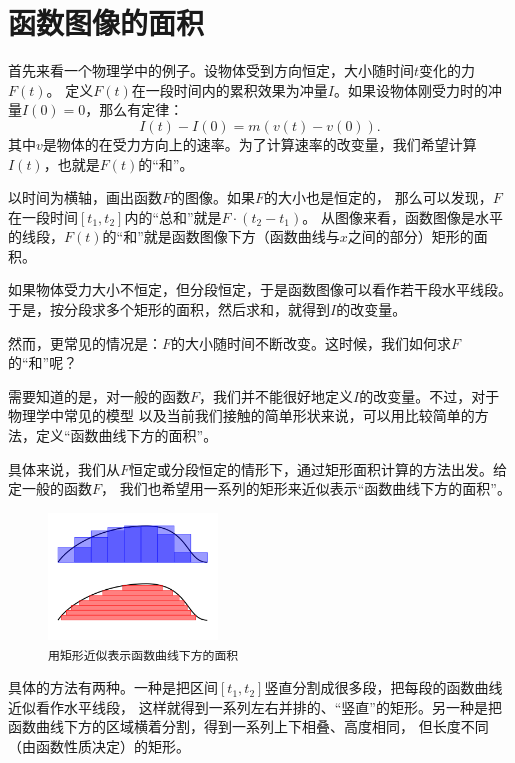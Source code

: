 \documentclass[12pt,UTF8]{ctexbook}
\begin{document}
\section{函数图像的面积}

首先来看一个物理学中的例子。设物体受到方向恒定，大小随时间$t$变化的力$F(t)$。
定义$F(t)$在一段时间内的累积效果为冲量$I$。如果设物体刚受力时的冲量$I(0) = 0$，那么有定律：
$$ I(t) - I(0) = m(v(t) - v(0)).$$
其中$v$是物体的在受力方向上的速率。为了计算速率的改变量，我们希望计算$I(t)$，也就是$F(t)$的“和”。

以时间为横轴，画出函数$F$的图像。如果$F$的大小也是恒定的，
那么可以发现，$F$在一段时间$[t_1, t_2]$内的“总和”就是$F \cdot (t_2 - t_1)$。
从图像来看，函数图像是水平的线段，$F(t)$的“和”就是函数图像下方（函数曲线与$x$之间的部分）矩形的面积。

如果物体受力大小不恒定，但分段恒定，于是函数图像可以看作若干段水平线段。
于是，按分段求多个矩形的面积，然后求和，就得到$I$的改变量。

然而，更常见的情况是：$F$的大小随时间不断改变。这时候，我们如何求$F$的“和”呢？

需要知道的是，对一般的函数$F$，我们并不能很好地定义$I$的改变量。不过，对于物理学中常见的模型
以及当前我们接触的简单形状来说，可以用比较简单的方法，定义“函数曲线下方的面积”。

具体来说，我们从$F$恒定或分段恒定的情形下，通过矩形面积计算的方法出发。给定一般的函数$F$，
我们也希望用一系列的矩形来近似表示“函数曲线下方的面积”。

\begin{figure}[h] %
    \vspace{4pt}
    \centering
    \includegraphics[width=0.4\textwidth]{积分定义5.png}
    \caption*{\texttt{用矩形近似表示函数曲线下方的面积}}
\end{figure}

具体的方法有两种。一种是把区间$[t_1, t_2]$竖直分割成很多段，把每段的函数曲线近似看作水平线段，
这样就得到一系列左右并排的、“竖直”的矩形。另一种是把函数曲线下方的区域横着分割，得到一系列上下相叠、高度相同，
但长度不同（由函数性质决定）的矩形。
\end{document}
